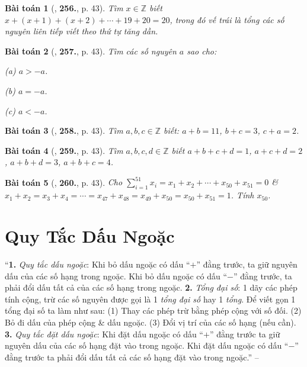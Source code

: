 \documentclass{article}
\numberwithin{equation}{section}
\newtheorem{baitoan}{Bài toán}
\begin{document}
\begin{baitoan}[\cite{Binh_Toan_6_tap_1}, \textbf{256.}, p. 43]
	Tìm $x\in\mathbb{Z}$ biết $x + (x + 1) + (x + 2) + \cdots + 19 + 20 = 20$, trong đó vế trái là tổng các số nguyên liên tiếp viết theo thứ tự tăng dần.
\end{baitoan}

\begin{baitoan}[\cite{Binh_Toan_6_tap_1}, \textbf{257.}, p. 43]
	Tìm các số nguyên $a$ sao cho:
	\begin{enumerate*}
		\item[(a)] $a > -a$.
		\item[(b)] $a = -a$.
		\item[(c)] $a < -a$.
	\end{enumerate*}
\end{baitoan}

\begin{baitoan}[\cite{Binh_Toan_6_tap_1}, \textbf{258.}, p. 43]
	Tìm $a,b,c\in\mathbb{Z}$ biết: $a + b = 11$, $b + c = 3$, $c + a = 2$.
\end{baitoan}

\begin{baitoan}[\cite{Binh_Toan_6_tap_1}, \textbf{259.}, p. 43]
	Tìm $a,b,c,d\in\mathbb{Z}$ biết $a + b + c + d = 1$, $a + c + d = 2$, $a + b + d = 3$, $a + b + c = 4$.
\end{baitoan}

\begin{baitoan}[\cite{Binh_Toan_6_tap_1}, \textbf{260.}, p. 43]
	Cho $\sum_{i=1}^{51} x_i = x_1 + x_2 + \cdots + x_{50} + x_{51} = 0$ \& $x_1 + x_2 = x_3 + x_4 = \cdots = x_{47} + x_{48} = x_{49} + x_{50} = x_{50} + x_{51} = 1$. Tính $x_{50}$.
\end{baitoan}


\section{Quy Tắc Dấu Ngoặc}
``\textbf{1.} \textit{Quy tắc dấu ngoặc}: Khi bỏ dấu ngoặc có dấu ``$+$'' đằng trước, ta giữ nguyên dấu của các số hạng trong ngoặc. Khi bỏ dấu ngoặc có dấu ``$-$'' đằng trước, ta phải đổi dấu tất cả của các số hạng trong ngoặc. \textbf{2.} \textit{Tổng đại số}: 1 dãy các phép tính cộng, trừ các số nguyên được gọi là 1 \textit{tổng đại số} hay 1 \textit{tổng}. Để viết gọn 1 tổng đại số ta làm như sau: (1) Thay các phép trừ bằng phép cộng với số đối. (2) Bỏ đi dấu của phép cộng \& dấu ngoặc. (3) Đổi vị trí của các số hạng (nếu cần). \textbf{3.} \textit{Quy tắc đặt dấu ngoặc}: Khi đặt dấu ngoặc có dấu ``$+$'' đằng trước ta giữ nguyên dấu của các số hạng đặt vào trong ngoặc. Khi đặt dấu ngoặc có dấu ``$-$'' đằng trước ta phải đổi dấu tất cả các số hạng đặt vào trong ngoặc.'' -- \cite[Chap. II, \S3, p. 39]{Tuyen_Toan_6}
\end{document}

